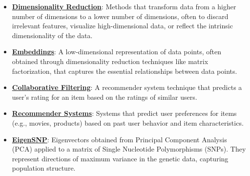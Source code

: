 \documentclass{article}%
\begin{document}
\begin{itemize}[leftmargin=*]%
\item \href{https://purdue.brightspace.com/d2l/common/assets/pdfjs-d2l-dist/1.0.14-legacy/web/viewer.html?file=\%2Fcontent\%2Fenforced\%2F1095467-wl.202510.CS.24300.001\%2F11L2-svd-pca-recommender.pdf\%3Fou\%3D1095467\&lang=en-us\&container=d2l-fileviewer-rendered-pdf\&fullscreen=d2l-fileviewer-rendered-pdf-dialog\&height=667#page=8}{\textbf{Dimensionality Reduction}}: Methods that transform data from a higher number of dimensions to a lower number of dimensions, often to discard irrelevant features, visualize high-dimensional data, or reflect the intrinsic dimensionality of the data.%
\item \href{https://purdue.brightspace.com/d2l/common/assets/pdfjs-d2l-dist/1.0.14-legacy/web/viewer.html?file=\%2Fcontent\%2Fenforced\%2F1095467-wl.202510.CS.24300.001\%2F11L2-svd-pca-recommender.pdf\%3Fou\%3D1095467\&lang=en-us\&container=d2l-fileviewer-rendered-pdf\&fullscreen=d2l-fileviewer-rendered-pdf-dialog\&height=667#page=5}{\textbf{Embeddings}}: A low-dimensional representation of data points, often obtained through dimensionality reduction techniques like matrix factorization, that captures the essential relationships between data points.%
\item \href{https://purdue.brightspace.com/d2l/common/assets/pdfjs-d2l-dist/1.0.14-legacy/web/viewer.html?file=\%2Fcontent\%2Fenforced\%2F1095467-wl.202510.CS.24300.001\%2F11L2-svd-pca-recommender.pdf\%3Fou\%3D1095467\&lang=en-us\&container=d2l-fileviewer-rendered-pdf\&fullscreen=d2l-fileviewer-rendered-pdf-dialog\&height=667#page=33}{\textbf{Collaborative Filtering}}: A recommender system technique that predicts a user's rating for an item based on the ratings of similar users.%
\item \href{https://purdue.brightspace.com/d2l/common/assets/pdfjs-d2l-dist/1.0.14-legacy/web/viewer.html?file=\%2Fcontent\%2Fenforced\%2F1095467-wl.202510.CS.24300.001\%2F11L2-svd-pca-recommender.pdf\%3Fou\%3D1095467\&lang=en-us\&container=d2l-fileviewer-rendered-pdf\&fullscreen=d2l-fileviewer-rendered-pdf-dialog\&height=667#page=29}{\textbf{Recommender Systems}}: Systems that predict user preferences for items (e.g., movies, products) based on past user behavior and item characteristics.%
\item \href{https://purdue.brightspace.com/d2l/common/assets/pdfjs-d2l-dist/1.0.14-legacy/web/viewer.html?file=\%2Fcontent\%2Fenforced\%2F1095467-wl.202510.CS.24300.001\%2F11L2-svd-pca-recommender.pdf\%3Fou\%3D1095467\&lang=en-us\&container=d2l-fileviewer-rendered-pdf\&fullscreen=d2l-fileviewer-rendered-pdf-dialog\&height=667#page=28}{\textbf{EigenSNP}}: Eigenvectors obtained from Principal Component Analysis (PCA) applied to a matrix of Single Nucleotide Polymorphisms (SNPs). They represent directions of maximum variance in the genetic data, capturing population structure.%

\end{itemize}
\end{document}
